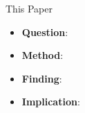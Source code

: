 \begin{frame}{This Paper}
\begin{itemize}
    \item \textbf{Question}: 
    \item \textbf{Method}: 
    \item \textbf{Finding}: 
    \item \textbf{Implication}: 
\end{itemize}
\end{frame}
